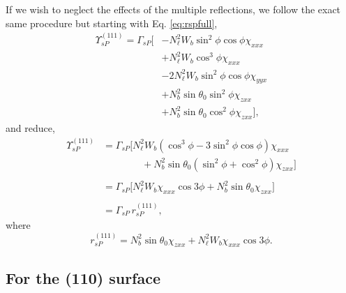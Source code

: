 If we wish to neglect the effects of the multiple reflections, we follow the
exact same procedure but starting with Eq. \eqref{eq:rspfull},
\begin{equation*}
\begin{split}
\Upsilon^{(111)}_{sP} =
\Gamma_{sP}
\big[
&- N^{2}_{\ell}W_{b}\sin^{2}\phi\cos\phi\chi_{xxx}\\
&+ N^{2}_{\ell}W_{b}\cos^{3}\phi\chi_{xxx}\\
&- 2N^{2}_{\ell}W_{b}\sin^{2}\phi\cos\phi\chi_{yyx}\\
&+ N^{2}_{b}\sin\theta_{0}\sin^{2}\phi\chi_{zxx}\\
&+ N^{2}_{b}\sin\theta_{0}\cos^{2}\phi\chi_{zxx}
\big],
\end{split}
\end{equation*}
and reduce,
\begin{equation*}
\begin{split}
\Upsilon^{(111)}_{sP} &=
\Gamma_{sP}
\big[
N^{2}_{\ell}W_{b}(\cos^{3}\phi - 3\sin^{2}\phi\cos\phi)\chi_{xxx}\\
&\qquad\qquad+ N^{2}_{b}\sin\theta_{0}(\sin^{2}\phi + \cos^{2}\phi)\chi_{zxx}
\big]\\\\
&=
\Gamma_{sP}
\big[
N^{2}_{\ell}W_{b}\chi_{xxx}\cos3\phi + N^{2}_{b}\sin\theta_{0}\chi_{zxx}
\big]\\\\
&= \Gamma_{sP}\,r^{(111)}_{sP},
\end{split}
\end{equation*}
where
\begin{equation}\label{eq:final-rsp.111}
r^{(111)}_{sP} = 
N^{2}_{b}\sin\theta_{0}\chi_{zxx} + N^{2}_{\ell}W_{b}\chi_{xxx}\cos3\phi.
\end{equation}


\subsection{For the (110) surface}

